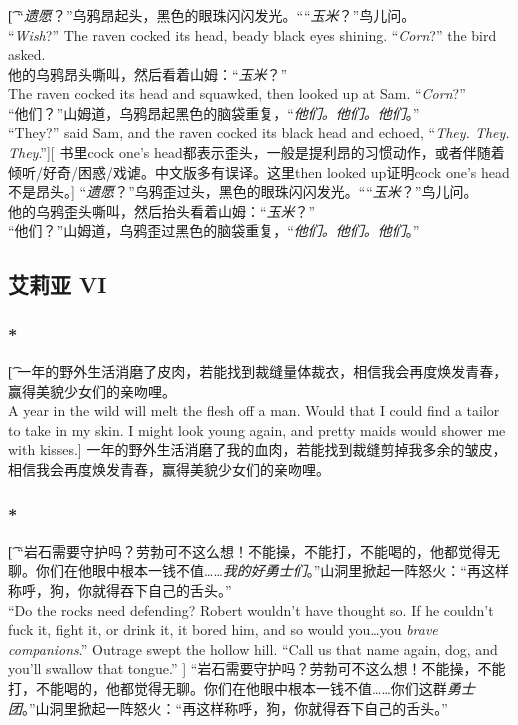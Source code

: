 \documentclass[12pt,a4paper]{article}
\begin{document}
\subsubsection{}\t[
	“\emph{遗愿}？”乌鸦昂起头，黑色的眼珠闪闪发光。““\emph{玉米}？”鸟儿问。\\
	“\emph{Wish}?” The raven cocked its head, beady black eyes shining. “\emph{Corn}?” the bird asked.\\
	他的乌鸦昂头嘶叫，然后看着山姆：“\emph{玉米}？”\\
	The raven cocked its head and squawked, then looked up at Sam. “\emph{Corn}?”\\
	“他们？”山姆道，乌鸦昂起黑色的脑袋重复，“\emph{他们。他们。他们}。”\\
	“They?” said Sam, and the raven cocked its black head and echoed, “\emph{They. They. They}.”][
	书里cock one's head都表示歪头，一般是提利昂的习惯动作，或者伴随着倾听/好奇/困惑/戏谑。中文版多有误译。这里then looked up证明cock one's head不是昂头。]
	“\emph{遗愿}？”乌鸦歪过头，黑色的眼珠闪闪发光。““\emph{玉米}？”鸟儿问。\\
	他的乌鸦歪头嘶叫，然后抬头看着山姆：“\emph{玉米}？”\\
	“他们？”山姆道，乌鸦歪过黑色的脑袋重复，“\emph{他们。他们。他们}。”

\subsection{艾莉亚 VI}
\subsubsection{\color{red}*}\t[
	一年的野外生活消磨了皮肉，若能找到裁缝量体裁衣，相信我会再度焕发青春，赢得美貌少女们的亲吻哩。\\
	A year in the wild will melt the flesh off a man. Would that I could find a tailor to take in my skin. I might look young again, and pretty maids would shower me with kisses.]
	一年的野外生活消磨了我的血肉，若能找到裁缝剪掉我多余的皱皮，相信我会再度焕发青春，赢得美貌少女们的亲吻哩。
	
\subsubsection{\color{red}*}\t[
	“岩石需要守护吗？劳勃可不这么想！不能操，不能打，不能喝的，他都觉得无聊。你们在他眼中根本一钱不值……\emph{我的好勇士们}。”山洞里掀起一阵怒火：“再这样称呼，狗，你就得吞下自己的舌头。”\\
	“Do the rocks need defending? Robert wouldn't have thought so. If he couldn't fuck it, fight it, or drink it, it bored him, and so would you\ldots you \emph{brave companions}.” Outrage swept the hollow hill. “Call us that name again, dog, and you'll swallow that tongue.” ]
	“岩石需要守护吗？劳勃可不这么想！不能操，不能打，不能喝的，他都觉得无聊。你们在他眼中根本一钱不值……你们这群\emph{勇士团}。”山洞里掀起一阵怒火：“再这样称呼，狗，你就得吞下自己的舌头。”
\end{document}
